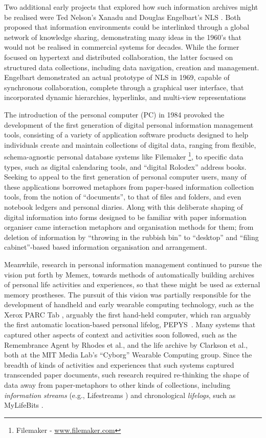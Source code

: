 \documentclass{acm_proc_article-sp}
\begin{document}
Two additional early projects that explored how such information archives might be realised were Ted Nelson’s Xanadu \cite{nelson1987literary} and Douglas Engelbart's NLS \cite{engelbart1968research}.  Both proposed that information environments could be interlinked through a global network of knowledge sharing, demonstrating many ideas in the 1960’s that would not be realised in commercial systems for decades.  While the former focused on hypertext and distributed collaboration, the latter focused on structured data collections, including data navigation, creation and management.  Engelbart demonstrated an actual prototype of NLS in 1969, capable of synchronous collaboration, complete through a graphical user interface, that incorporated dynamic hierarchies, hyperlinks, and multi-view representations  

The introduction of the personal computer (PC) in 1984 provoked the development of the first generation of digital personal information management tools, consisting of a variety of application software products designed to help individuals create and maintain collections of digital data, ranging from flexible, schema-agnostic personal database systems like Filemaker \footnote{Filemaker - \url{www.filemaker.com}}, to specific data types, such as digital calendaring tools, and ``digital Rolodex'' address books.  Seeking to appeal to the first generation of personal computer users, many of these applications borrowed metaphors from paper-based information collection tools, from the notion of ``documents'', to that of files and folders, and even notebook ledgers and personal diaries. Along with this deliberate shaping of digital information into forms designed to be familiar with paper information organiser came interaction metaphors and organisation methods for them; from deletion of information by ``throwing in the rubbish bin'' to ``desktop'' and ``filing cabinet''-based based information organisation and arrangement.

Meanwhile, research in personal information management continued to pursue the vision put forth by Memex, towards methods of automatically building archives of personal life activities and experiences, so that these might be used as external memory prostheses.  The pursuit of this vision was partially responsible for the development of handheld and early wearable computing technology, such as the Xerox PARC Tab \cite{schilit1993parctab}, arguably the first hand-held computer, which ran arguably the first automatic location-based personal lifelog, PEPYS~\cite{newman1991pepys}.  Many systems that captured other aspects of context and activities soon followed, such as the Remembrance Agent by Rhodes et al., and the life archive by Clarkson et al., both at the MIT Media Lab's ``Cyborg'' Wearable Computing group. Since the breadth of kinds of activities and experiences that such systems captured transcended paper documents, such research required re-thinking the shape of data away from paper-metaphors to other kinds of collections, including \emph{information streams} (e.g., Lifestreams \cite{fertig1996lifestreams}) and chronological \emph{lifelogs}, such as MyLifeBits \cite{gemmell2002mylifebits}.
\end{document}
